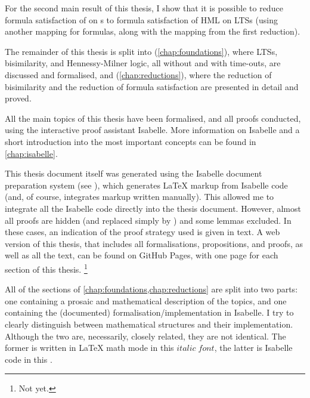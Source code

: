 \begin{isabellebody}
\begin{isamarkuptext}
For the second main result of this thesis, I show that it is possible to reduce formula satisfaction of \HMLt{} on \LTSt{}s to formula satisfaction of HML on LTSs (using another mapping for formulas, along with the mapping from the first reduction).%
\end{isamarkuptext}\isamarkuptrue%
%
\isadelimdocument
%
\endisadelimdocument
%
\isatagdocument
%
\isamarkuptrue%
%
\endisatagdocument
{\isafolddocument}%
%
\isadelimdocument
%
\endisadelimdocument
%
\begin{isamarkuptext}%
The remainder of this thesis is split into  (\cref{chap:foundations}), where LTSs, bisimilarity, and Hennessy-Milner logic, all without and with time-outs, are discussed and formalised, and  (\cref{chap:reductions}), where the reduction of bisimilarity and the reduction of formula satisfaction are presented in detail and proved.

All the main topics of this thesis have been formalised, and all proofs conducted, using the interactive proof assistant Isabelle. More information on Isabelle and a short introduction into the most important concepts can be found in \cref{chap:isabelle}.

This thesis document itself was generated using the Isabelle document preparation system (see \cite{isa_system}), which generates \LaTeX{} markup from Isabelle code (and, of course, integrates markup written manually). This allowed me to integrate all the Isabelle code directly into the thesis document.
However, almost all proofs are hidden (and replaced simply by \isa{{\isasymproof}}) and some lemmas excluded. In these cases, an indication of the proof strategy used is given in text. A web version of this thesis, that includes all formalisations, propositions, and proofs, as well as all the text, can be found on GitHub Pages, with one page for each section of this thesis.%
\footnote{Not yet.}

All of the sections of \cref{chap:foundations,chap:reductions} are split into two parts: one containing a prosaic and mathematical description of the topics, and one containing the (documented) formalisation/implementation in Isabelle. I try to clearly distinguish between mathematical structures and their implementation. Although the two are, necessarily, closely related, they are not identical. The former is written in \LaTeX{} math mode in this $italic\;font$, the latter is Isabelle code in this .%
\end{isamarkuptext}\isamarkuptrue%
%
\isadelimtheory
%
\endisadelimtheory
%
\isatagtheory
%
\endisatagtheory
{\isafoldtheory}%
%
\isadelimtheory
%
\endisadelimtheory
%
\end{isabellebody}%
